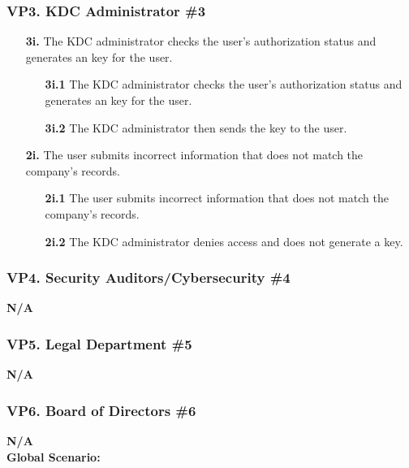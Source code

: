 \documentclass[]{article}
\begin{document}
\subsubsection*{VP3. KDC Administrator \#3}
\begin{enumerate}
	\item[\textbf{3i.}] The KDC administrator checks the user's authorization status and generates an key for the user.
		\begin{enumerate}
			\item[\textbf{3i.1}] The KDC administrator checks the user's authorization status and generates an key for the user.
			\item[\textbf{3i.2}] The KDC administrator then sends the key to the user.
		\end{enumerate}
	\item[\textbf{2i.}] The user submits incorrect information that does not match the company's records.
		\begin{enumerate}
			\item[\textbf{2i.1}] The user submits incorrect information that does not match the company's records.
			\item[\textbf{2i.2}] The KDC administrator denies access and does not generate a key.
		\end{enumerate}
\end{enumerate}
\subsubsection*{VP4. Security Auditors/Cybersecurity \#4}
\textbf{N/A}
\subsubsection*{VP5. Legal Department \#5}
\textbf{N/A}
\subsubsection*{VP6. Board of Directors \#6}
\textbf{N/A}\\

\noindent \textbf{Global Scenario:}
\end{document}
